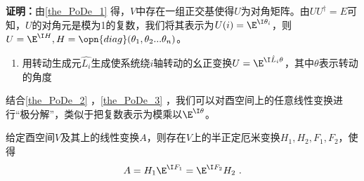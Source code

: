 \textbf{证明：}由\autoref{the_PoDe_1} 得，$V$中存在一组正交基使得$U$为对角矩阵。由$UU^{\dagger}=E$可知，$U$的对角元是模为1的复数，我们将其表示为$U(i)=\E^{\I\theta_i}$，则$U=\E^{\I H},H=\opn{diag}(\theta_1,\theta_2...\theta_n)$。
\begin{example}{}
\begin{enumerate}
\item 用转动生成元$\hat{L_i}$生成使系统绕$i$轴转动的幺正变换$U=\E^{\I\hat{L}_i\theta}$，其中$\theta$表示转动的角度
\end{enumerate}
\end{example}
结合\autoref{the_PoDe_2} ，\autoref{the_PoDe_3} ，我们可以对酉空间上的任意线性变换进行“极分解”，类似于把复数表示为模乘以$\E^{\I\theta}$。
\begin{corollary}{}
给定酉空间$V$及其上的线性变换$A$，则存在$V$上的半正定厄米变换$H_1,H_2,F_1,F_2$，使得
\begin{equation}
A=H_1\E^{\I F_1}=\E^{\I F_2}H_2~.
\end{equation}
\end{corollary}
